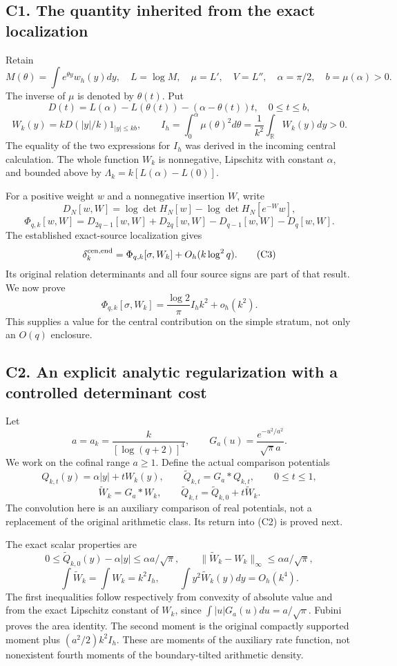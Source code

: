 \documentclass[
  11pt,
]{article}
\begin{document}
\subsection{C1. The quantity inherited from the exact
localization}\label{c1.-the-quantity-inherited-from-the-exact-localization}

Retain \[
M(\theta)=\int e^{\theta y}w_h(y)dy,\quad L=\log M,
\quad \mu=L',\quad V=L'',\quad \alpha=\pi/2,
\quad b=\mu(\alpha)>0.
\] The inverse of \(\mu\) is denoted by \(\theta(t)\). Put \[
D(t)=L(\alpha)-L(\theta(t))-(\alpha-\theta(t))t,
\quad0\le t\le b,
\] \[
W_k(y)=kD(|y|/k)1_{|y|\le kb},\qquad
I_h=\int_0^\alpha\mu(\theta)^2d\theta
=\frac1{k^2}\int_{\mathbb R}W_k(y)dy>0.
\tag{C1}
\] The equality of the two expressions for \(I_h\) was derived in the
incoming central calculation. The whole function \(W_k\) is nonnegative,
Lipschitz with constant \(\alpha\), and bounded above by
\(\Lambda_k=k[L(\alpha)-L(0)]\).

For a positive weight \(w\) and a nonnegative insertion \(W\), write \[
D_N[w,W]=\log\det H_N[w]-\log\det H_N[e^{-W}w],
\] \[
\Phi_{q,k}[w,W]=D_{2q-1}[w,W]+D_{2q}[w,W]
-D_{q-1}[w,W]-D_q[w,W].\tag{C2}
\] The established exact-source localization gives \[
\delta_k^{\rm cen,end}
=\Phi_{q,k}[\sigma,W_k]+O_h(k\log^2q).
\tag{C3}
\] Its original relation determinants and all four source signs are part
of that result. We now prove \[
\boxed{\Phi_{q,k}[\sigma,W_k]
=\frac{\log2}{\pi}I_h k^2+o_h(k^2).}\tag{C4}
\] This supplies a value for the central contribution on the simple
stratum, not only an \(O(q)\) enclosure.

\subsection{C2. An explicit analytic regularization with a controlled
determinant
cost}\label{c2.-an-explicit-analytic-regularization-with-a-controlled-determinant-cost}

Let \[
a=a_k=\frac{k}{[\log(q+2)]^4},\qquad
G_a(u)=\frac{e^{-u^2/a^2}}{\sqrt\pi a}.
\] We work on the cofinal range \(a\ge1\). Define the actual comparison
potentials \[
Q_{k,t}(y)=\alpha|y|+tW_k(y),\qquad
\widetilde Q_{k,t}=G_a*Q_{k,t},\qquad0\le t\le1,
\] \[
\widetilde W_k=G_a*W_k,
\qquad \widetilde Q_{k,t}=\widetilde Q_{k,0}+t\widetilde W_k.
\tag{C5}
\] The convolution here is an auxiliary comparison of real potentials,
not a replacement of the original arithmetic class. Its return into (C2)
is proved next.

The exact scalar properties are \[
0\le\widetilde Q_{k,0}(y)-\alpha|y|\le\alpha a/\sqrt\pi,
\qquad
\|\widetilde W_k-W_k\|_\infty\le\alpha a/\sqrt\pi,
\tag{C6}
\] \[
\int\widetilde W_k=\int W_k=k^2I_h,
\qquad
\int y^2\widetilde W_k(y)dy=O_h(k^4).
\tag{C7}
\] The first inequalities follow respectively from convexity of absolute
value and from the exact Lipschitz constant of \(W_k\), since
\(\int|u|G_a(u)du=a/\sqrt\pi\). Fubini proves the area identity. The
second moment is the original compactly supported moment plus
\((a^2/2)k^2I_h\). These are moments of the auxiliary rate function, not
nonexistent fourth moments of the boundary-tilted arithmetic density.
\end{document}
